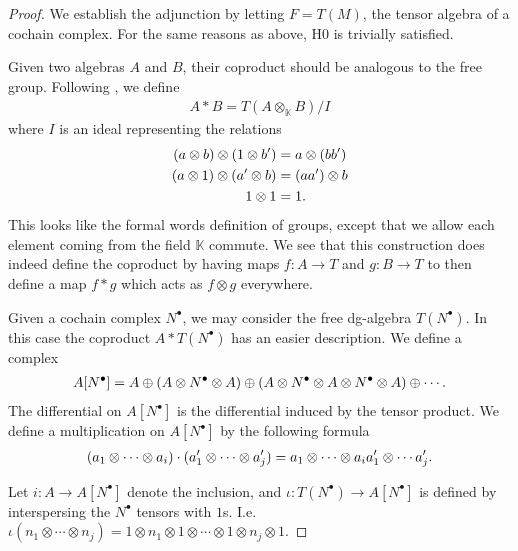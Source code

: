 \documentclass[../thesis.tex]{subfiles}
\begin{document}
            \begin{proof}
                We establish the adjunction by letting $F = T(M)$, the tensor algebra of a cochain complex. For the same reasons as above, H0 is trivially satisfied. 
                
                Given two algebras $A$ and $B$, their coproduct should be analogous to the free group. Following \cite{Aambø21}, we define
                \begin{align*}
                    A\ast B = T(A\otimes_\mathbb{K}B)/I
                \end{align*}
                where $I$ is an ideal representing the relations
                \begin{align*}
                    (a\otimes b)\otimes (1\otimes b') & = a\otimes (bb') \\ 
                    (a\otimes 1)\otimes (a'\otimes b) & = (aa')\otimes b \\ 
                    1\otimes 1 & = 1\tt{.}
                \end{align*}
                This looks like the formal words definition of groups, except that we allow each element coming from the field $\mathbb{K}$ commute. We see that this construction does indeed define the coproduct by having maps $f: A \rightarrow T$ and $g : B \rightarrow T$ to then define a map $f\ast g$ which acts as $f\otimes g$ everywhere.

                Given a cochain complex $N^\bullet$, we may consider the free dg-algebra $T(N^\bullet)$. In this case the coproduct $A\ast T(N^\bullet)$ has an easier description. We define a complex
                \begin{align*}
                    A[N^\bullet] = A \oplus (A \otimes N^\bullet \otimes A) \oplus (A \otimes N^\bullet \otimes A \otimes N^\bullet \otimes A) \oplus \cdots\tt{.}
                \end{align*}
                The differential on $A[N^\bullet]$ is the differential induced by the tensor product. We define a multiplication on $A[N^\bullet]$ by the following formula
                \begin{align*}
                    (a_1\otimes\cdots\otimes a_i)\cdot(a_1'\otimes\cdots\otimes a_j') = a_1\otimes\cdots\otimes a_ia_1'\otimes\cdots a_j'\tt{.}
                \end{align*}

                Let $i : A \rightarrow A[N^\bullet]$ denote the inclusion, and $\iota : T(N^\bullet) \rightarrow A[N^\bullet]$ is defined by interspersing the $N^\bullet$ tensors with $1$s. I.e. $\iota(n_1\otimes\cdots\otimes n_j) = 1 \otimes n_1 \otimes 1 \otimes \cdots \otimes 1 \otimes n_j \otimes 1$.


\end{proof}
\end{document}
